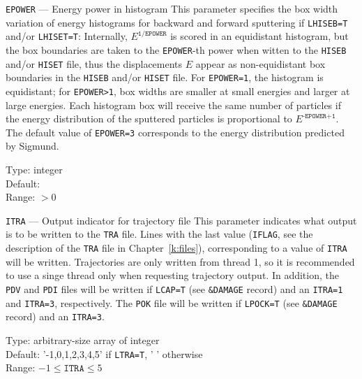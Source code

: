 \begin{keydescription}{\texttt{EPOWER} --- Energy power in histogram}
%
  This parameter specifies the box width variation of energy histograms for backward and 
  forward sputtering if \texttt{LHISEB=T} and/or \texttt{LHISET=T}: Internally, 
  $E^\texttt{1/EPOWER}$ is scored in an equidistant histogram, but the box boundaries are 
  taken to the \texttt{EPOWER}-th power when witten to the \texttt{HISEB} and/or \texttt{HISET} 
  file, thus the displacements $E$ appear as non-equidistant box boundaries in the 
  \texttt{HISEB} and/or \texttt{HISET} file. For \texttt{EPOWER=1}, the histogram is 
  equidistant; for \texttt{EPOWER>1}, box widths are smaller at small energies and larger at 
  large energies. Each histogram box will receive the same number of particles if the energy 
  distribution of the sputtered particles is proportional to $E^\texttt{-EPOWER+1}$. The 
  default value of \texttt{EPOWER=3} corresponds to the energy distribution predicted by 
  Sigmund. 
  \begin{keytab}
    Type:    \> integer \\
    Default:   \\
    Range:   \> $>0$
  \end{keytab}
\end{keydescription}

\begin{keydescription}{\texttt{ITRA} --- Output indicator for trajectory file}
%
  This parameter indicates what output is to be written to the \texttt{TRA} file. Lines with 
  the last value (\texttt{IFLAG}, see the description of the \texttt{TRA} file
  in Chapter~\ref{k:files}), corresponding to a value of \texttt{ITRA} will be
  written. 
  Trajectories are only written from thread 1, so it is recommended to use a singe thread 
  only when requesting trajectory output.
  In addition, the \texttt{PDV} and \texttt{PDI} files will be written
  if \texttt{LCAP=T} (see \texttt{\&DAMAGE} record) and an \texttt{ITRA=1}
  and \texttt{ITRA=3}, respectively. The \texttt{POK} file will be written if
  \texttt{LPOCK=T} (see \texttt{\&DAMAGE} record) and an \texttt{ITRA=3}.
  \begin{keytab}
    Type:    \> arbitrary-size array of integer \\
    Default: \> '-1,0,1,2,3,4,5' if \texttt{LTRA=T}, ' ' otherwise \\
    Range:   \> $-1 \le \texttt{ITRA} \le 5$
  \end{keytab}
\end{keydescription}

